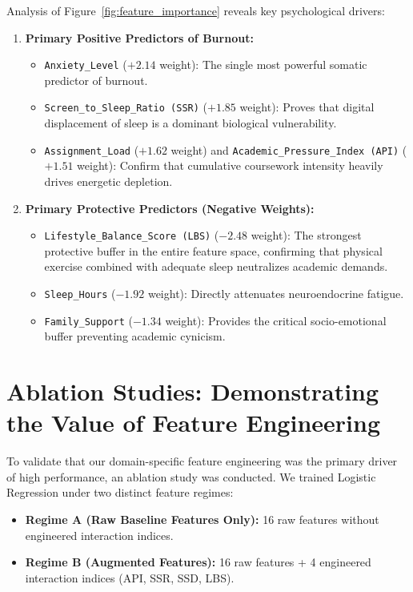 \documentclass[12pt,a4paper,oneside]{report}
\begin{document}
Analysis of Figure~\ref{fig:feature_importance} reveals key psychological drivers:
\begin{enumerate}
    \item \textbf{Primary Positive Predictors of Burnout:}
    \begin{itemize}
        \item \texttt{Anxiety\_Level} ($+2.14$ weight): The single most powerful somatic predictor of burnout.
        \item \texttt{Screen\_to\_Sleep\_Ratio (SSR)} ($+1.85$ weight): Proves that digital displacement of sleep is a dominant biological vulnerability.
        \item \texttt{Assignment\_Load} ($+1.62$ weight) and \texttt{Academic\_Pressure\_Index (API)} ($+1.51$ weight): Confirm that cumulative coursework intensity heavily drives energetic depletion.
    \end{itemize}
    \item \textbf{Primary Protective Predictors (Negative Weights):}
    \begin{itemize}
        \item \texttt{Lifestyle\_Balance\_Score (LBS)} ($-2.48$ weight): The strongest protective buffer in the entire feature space, confirming that physical exercise combined with adequate sleep neutralizes academic demands.
        \item \texttt{Sleep\_Hours} ($-1.92$ weight): Directly attenuates neuroendocrine fatigue.
        \item \texttt{Family\_Support} ($-1.34$ weight): Provides the critical socio-emotional buffer preventing academic cynicism.
    \end{itemize}
\end{enumerate}

\section{Ablation Studies: Demonstrating the Value of Feature Engineering}
\label{sec:ablation_studies}
To validate that our domain-specific feature engineering was the primary driver of high performance, an ablation study was conducted. We trained Logistic Regression under two distinct feature regimes:
\begin{itemize}
    \item \textbf{Regime A (Raw Baseline Features Only):} 16 raw features without engineered interaction indices.
    \item \textbf{Regime B (Augmented Features):} 16 raw features + 4 engineered interaction indices (API, SSR, SSD, LBS).
\end{itemize}
\end{document}
